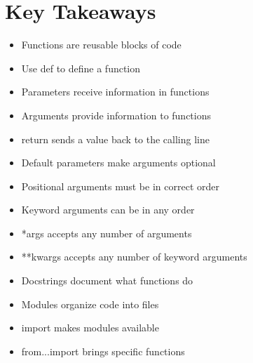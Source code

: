 \section*{Key Takeaways}
\begin{itemize}
    \item Functions are reusable blocks of code
    \item Use def to define a function
    \item Parameters receive information in functions
    \item Arguments provide information to functions
    \item return sends a value back to the calling line
    \item Default parameters make arguments optional
    \item Positional arguments must be in correct order
    \item Keyword arguments can be in any order
    \item *args accepts any number of arguments
    \item **kwargs accepts any number of keyword arguments
    \item Docstrings document what functions do
    \item Modules organize code into files
    \item import makes modules available
    \item from...import brings specific functions
\end{itemize} 